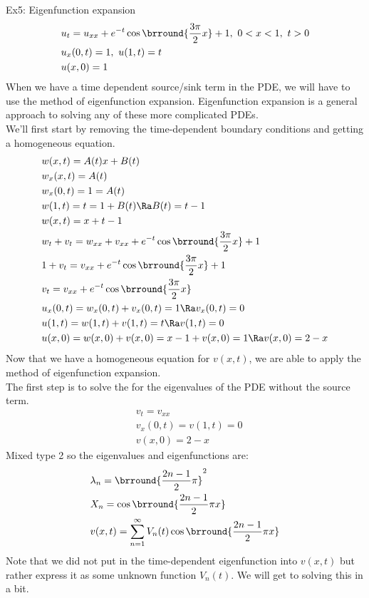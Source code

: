 Ex5: Eigenfunction expansion
\begin{align*}
    &u_t=u_{xx}+e^{-t}\cos\brround{\frac{3\pi}{2}x}+1,\ 0<x<1,\ t>0\\
    &u_x(0,t)=1,\ u(1,t)=t\\
    &u(x,0)=1
\end{align*}
When we have a time dependent source/sink term in the PDE, we will have to use the method of eigenfunction expansion. Eigenfunction expansion is a general approach to solving any of these more complicated PDEs.\\
We'll first start by removing the time-dependent boundary conditions and getting a homogeneous equation.
\begin{align*}
    &w(x,t)=A(t)x+B(t)\\
    &w_x(x,t)=A(t)\\
    &w_x(0,t)=1=A(t)\\
    &w(1,t)=t=1+B(t)\Ra B(t)=t-1\\
    &w(x,t)=x+t-1\\
    &w_t+v_t=w_{xx}+v_{xx}+e^{-t}\cos\brround{\frac{3\pi}{2}x}+1\\
    &1+v_t=v_{xx}+e^{-t}\cos\brround{\frac{3\pi}{2}x}+1\\
    &v_t=v_{xx}+e^{-t}\cos\brround{\frac{3\pi}{2}x}\\
    &u_x(0,t)=w_x(0,t)+v_x(0,t)=1\Ra v_x(0,t)=0\\
    &u(1,t)=w(1,t)+v(1,t)=t\Ra v(1,t)=0\\
    &u(x,0)=w(x,0)+v(x,0)=x-1+v(x,0)=1\Ra v(x,0)=2-x
\end{align*}
Now that we have a homogeneous equation for $v(x,t)$, we are able to apply the method of eigenfunction expansion.\\
The first step is to solve the for the eigenvalues of the PDE without the source term.
\begin{align*}
    &v_t=v_{xx}\\
    &v_x(0,t)=v(1,t)=0\\
    &v(x,0)=2-x
\end{align*}
Mixed type 2 so the eigenvalues and eigenfunctions are:\\
\begin{align*}
    &\lambda_n=\brround{\frac{2n-1}{2}\pi}^2\\
    &X_n=\cos\brround{\frac{2n-1}{2}\pi x}\\
    &v(x,t)=\sum_{n=1}^\infty V_n(t)\cos\brround{\frac{2n-1}{2}\pi x}
\end{align*}
Note that we did not put in the time-dependent eigenfunction into $v(x,t)$ but rather express it as some unknown function $V_n(t)$. We will get to solving this in a bit.\\
